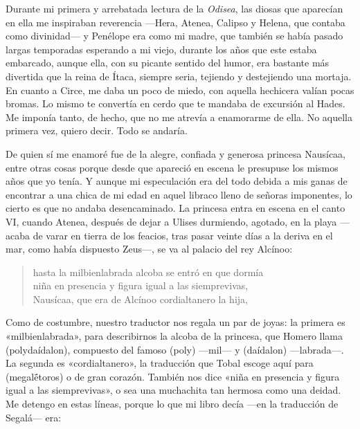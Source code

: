 \label{cap:nausicaa}

Durante mi primera y arrebatada lectura de la \emph{Odisea}, las diosas que aparecían en ella me inspiraban reverencia ---Hera, Atenea, Calipso y Helena, que contaba como divinidad--- y Penélope era como mi madre, que también se había pasado largas temporadas esperando a mi viejo, durante los años que este estaba embarcado, aunque ella, con su picante sentido del humor, era bastante más divertida que la reina de Ítaca, siempre seria, tejiendo y destejiendo una mortaja. En cuanto a Circe, me daba un poco de miedo, con aquella hechicera valían pocas bromas. Lo mismo te convertía en cerdo que te mandaba de excursión al Hades. Me imponía tanto, de hecho, que no me atrevía a enamorarme de ella. No aquella primera vez, quiero decir. Todo se andaría.

De quien sí me enamoré fue de la alegre, confiada y generosa princesa Nausícaa, entre otras cosas porque desde que apareció en escena le presupuse los mismos años que yo tenía. Y aunque mi especulación era del todo debida a mis ganas de encontrar a una chica de mi edad en aquel libraco lleno de señoras imponentes, lo cierto es que no andaba desencaminado. La princesa entra en escena en el canto VI, cuando Atenea, después de dejar a Ulises durmiendo, agotado, en la playa ---acaba de varar en tierra de los feacios, tras pasar veinte días a la deriva en el mar, como había dispuesto Zeus---, se va al palacio del rey Alcínoo:

\begin{verse}
hasta la milbienlabrada alcoba se entró en que dormía\\
niña en presencia y figura igual a las siemprevivas,\\
Nausícaa, que era de Alcínoo cordialtanero la hija,
\end{verse}

Como de costumbre, nuestro traductor nos regala un par de joyas: la primera es «milbienlabrada», para describirnos la alcoba de la princesa, que Homero llama  (polydaídalon), compuesto del famoso  (poly) ---mil--- y  (daídalon) ---labrada---. La segunda es «cordialtanero», la traducción que Tobal escoge aquí para  (megalḗtoros) o de gran corazón. También nos dice «niña en presencia y figura igual a las siemprevivas», o sea una muchachita tan hermosa como una deidad. Me detengo en estas líneas, porque lo que mi libro decía ---en la traducción de Segalá--- era:

